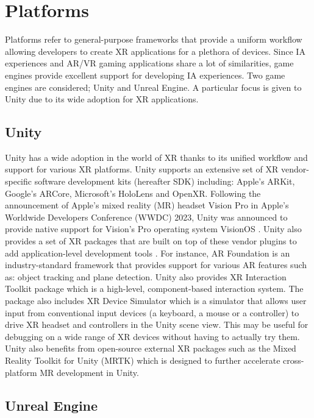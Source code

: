 \documentclass{vgtc}                          %
\begin{document}
\section{Platforms}

Platforms refer to general-purpose frameworks that provide a uniform workflow
allowing developers to create XR applications for a plethora of devices. Since
IA experiences and AR/VR gaming applications share a lot of similarities, game
engines provide excellent support for developing IA experiences. Two game
engines are considered; Unity and Unreal Engine. A particular focus is given
to Unity due to its wide adoption for XR applications.

\subsection{Unity}
Unity has a wide adoption in the world of XR thanks to its unified workflow
and support for various XR platforms. Unity supports an extensive set of XR
vendor-specific software development kits (hereafter SDK) including: Apple's
ARKit, Google's ARCore, Microsoft's HoloLens and OpenXR. Following the
announcement of Apple's mixed reality (MR) headset Vision Pro in Apple's
Worldwide Developers Conference (WWDC) 2023, Unity was announced to provide
native support for Vision's Pro operating system VisionOS \cite{web:vision_pro_unity}.
Unity also provides a set of XR packages that are built on top of these vendor
plugins to add application-level development tools \cite{unity:xr_packages}.
For instance, AR Foundation is an industry-standard framework that provides
support for various AR features such as: object tracking and plane detection.
Unity also provides XR Interaction Toolkit package which is a high-level,
component-based interaction system. The package also includes XR Device
Simulator which is a simulator that allows user input from conventional input
devices (a keyboard, a mouse or a controller) to drive XR headset and
controllers in the Unity scene view. This may be useful for debugging on a
wide range of XR devices without having to actually try them. Unity also
benefits from open-source external XR packages such as the Mixed Reality
Toolkit for Unity (MRTK) \cite{mrtk:repo} which is designed to further accelerate cross-platform MR development in Unity.

\subsection{Unreal Engine}
\end{document}
